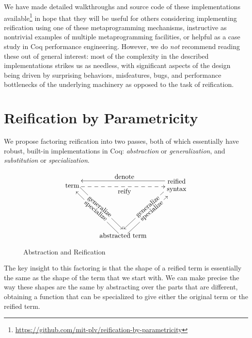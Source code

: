 We have made detailed walkthroughs and source code of these implementations available\footnote{\url{https://github.com/mit-plv/reification-by-parametricity}} in hope that they will be useful for others considering implementing reification using one of these metaprogramming mechanisms, instructive as nontrivial examples of multiple metaprogramming facilities, or helpful as a case study in Coq performance engineering.
However, we do \emph{not} recommend reading these out of general interest:
most of the complexity in the described implementations strikes us as needless,
with significant aspects of the design being driven by surprising behaviors, misfeatures, bugs, and performance bottlenecks of the underlying machinery as opposed to the task of reification.

\section{Reification by Parametricity} \label{sec:reification-by-parametricity}

We propose factoring reification into two passes, both of which essentially have robust, built-in implementations in Coq: \emph{abstraction} or \emph{generalization}, and \emph{substitution} or \emph{specialization}.


\begin{figure}
    \vspace{-40pt}
    \[
    \xymatrix{
        \txt{term}
        \ar@<1ex>[ddr]|{\txt{\rotatebox{-40}{generalize}}}
        \ar@<-1ex>@{-->}[rr]_{\txt{reify}}
        &&
        \txt{reified \\ syntax}
        \ar@<-1ex>[ll]_{\txt{denote}}
        \ar@<-1ex>[ddl]|{\txt{\rotatebox{40}{generalize}}}
        \\ \\
        &
        \txt{abstracted term}
        \ar@<1ex>[uul]|{\txt{\rotatebox{-40}{specialize}}}
        \ar@<-1ex>[uur]|{\txt{\rotatebox{40}{specialize}}}
    }
    \]
    \vspace{-20pt}
    \caption{Abstraction and Reification}\label{fig:denote-reify}
\end{figure}

The key insight to this factoring is that the shape of a reified term is essentially the same as the shape of the term that we start with.
We can make precise the way these shapes are the same by abstracting over the parts that are different, obtaining a function that can be specialized to give either the original term or the reified term.

